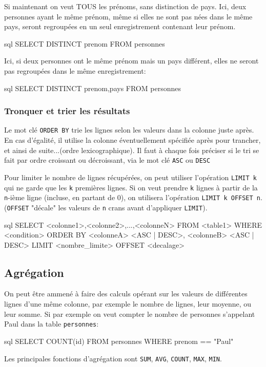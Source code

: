 \documentclass[a4paper]{scrartcl}
\begin{document}
				\exemple Si maintenant on veut TOUS les prénoms, sans distinction de pays. 
				Ici, deux personnes ayant le même prénom, même si elles ne sont pas nées dans le même pays, seront regroupées en un seul enregistrement contenant leur prénom.
				\begin{code}{sql}
					SELECT DISTINCT prenom
					FROM personnes
				\end{code}

				\exemple Ici, si deux personnes ont le même prénom mais un pays différent, elles ne seront pas regroupées dans le même enregistrement:
				\begin{code}{sql}
					SELECT DISTINCT prenom,pays
					FROM personnes
				\end{code}

			\subsubsection{Tronquer et trier les résultats}
				Le mot clé \texttt{ORDER BY} trie les lignes selon les valeurs dans la colonne juste après.
				En cas d'égalité, il utilise la colonne éventuellement spécifiée après pour trancher, et ainsi de suite...(ordre lexicographique).
				Il faut à chaque fois préciser si le tri se fait par ordre croissant ou décroissant, via le mot clé \texttt{ASC} ou \texttt{DESC}
				
				Pour limiter le nombre de lignes récupérées, on peut utiliser l'opération \texttt{LIMIT k} qui ne garde que les \texttt{k} premières lignes.
				Si on veut prendre \texttt{k} lignes à partir de la \texttt{n}-ième ligne (incluse, en partant de 0),
				on utilisera l'opération \texttt{LIMIT k OFFSET n}. (\texttt{OFFSET} "décale" les valeurs de \texttt{n} crans avant d'appliquer \texttt{LIMIT}).

				\begin{code}{sql}
					SELECT <colonne1>,<colonne2>,...,<colonneN>
					FROM <table1>
					WHERE <condition>
					ORDER BY <colonneA> <ASC | DESC>, <colonneB> <ASC | DESC>
					LIMIT <nombre_limite>
					OFFSET <decalage>
				\end{code}

		\subsection{Agrégation}
			\semidef On peut être ammené à faire des calculs opérant sur les valeurs de différentes lignes d'une même colonne,
			par exemple le nombre de lignes, leur moyenne, ou leur somme.
			Si par exemple on veut compter le nombre de personnes s'appelant Paul dans la table \texttt{personnes}:			
			\begin{code}{sql}
				SELECT COUNT(id)
				FROM personnes
				WHERE prenom == "Paul"
			\end{code}
			Les principales fonctions d'agrégation sont \texttt{SUM}, \texttt{AVG}, \texttt{COUNT}, \texttt{MAX}, \texttt{MIN}.
\end{document}

